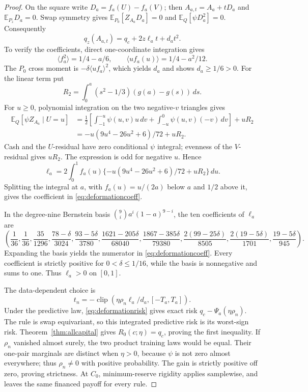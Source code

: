 \documentclass[11pt,a4paper]{amsart}
\theoremstyle{plain}
\theoremstyle{definition}
\theoremstyle{remark}
\newcommand{\EE}{\mathbb{E}}
\DeclareMathOperator{\clip}{clip}
\newcommand{\br}[1]{\langle #1\rangle}
\begin{document}
\begin{proof}
On the square write $D_a=f_a(U)-f_a(V)$; then $A_{a,t}=A_a+tD_a$ and $\EE_{P_z}D_a=0$. Swap symmetry gives $\EE_{P_0}[Z_{A_a}D_a]=0$ and $\EE_Q[\psi D_a^2]=0$. Consequently
\begin{equation}\label{eq:deformationrisk}
 q_z(A_{a,t})=q_c+2z\ell_a t+d_a t^2.
\end{equation}
To verify the coefficients, direct one-coordinate integration gives
\[
 \br{f_a^2}=1/4-a/6,\qquad
 \br{u f_a(u)}=1/4-a^2/12.
\]
The $P_0$ cross moment is $-\delta\br{uf_a}^2$, which yields $d_a$ and shows $d_a\ge1/6>0$.
For the linear term put
\[
 R_2=\int_0^a(s^2-1/3)(g(a)-g(s))\,ds.
\]
For $u\ge0$, polynomial integration on the two negative-$v$ triangles gives
\begin{align*}
 \EE_Q[\psi Z_{A_a}\mid U=u]
 &=\tfrac12\left[\int_{-1}^{-u}\psi(u,v)u\,dv
                  +\int_{-u}^{0}\psi(u,v)(-v)\,dv\right]+uR_2\\
 &=-u(9u^4-26u^2+6)/72+uR_2.
\end{align*}
Cash and the $U$-residual have zero conditional $\psi$ integral; evenness of the $V$-residual gives $uR_2$. The expression is odd for negative $u$. Hence
\begin{equation}\label{eq:ellintegral}
 \ell_a=2\int_0^1 f_a(u)
       \{-u(9u^4-26u^2+6)/72+uR_2\}\,du.
\end{equation}
Splitting the integral at $a$, with $f_a(u)=u/(2a)$ below $a$ and $1/2$ above it, gives the coefficient in \eqref{eq:deformationcoeff}.

In the degree-nine Bernstein basis $\binom9i a^i(1-a)^{9-i}$, the ten coefficients of $\ell_a$ are
\begin{equation}\label{eq:bernstein}
 \left(
 \frac1{36},\frac1{36},\frac{35}{1296},
 \frac{78-\delta}{3024},\frac{93-5\delta}{3780},
 \frac{1621-205\delta}{68040},\frac{1867-385\delta}{79380},
 \frac{2(99-25\delta)}{8505},\frac{2(19-5\delta)}{1701},
 \frac{19-5\delta}{945}\right).
\end{equation}
Expanding the basis yields the numerator in \eqref{eq:deformationcoeff}. Every coefficient is strictly positive for $0<\delta\le1/16$, while the basis is nonnegative and sums to one. Thus $\ell_a>0$ on $[0,1]$.

The data-dependent choice is
\[
 t_n=-\clip(\eta\rho_n\ell_a/d_a,[-T_a,T_a]).
\]
Under the predictive law, \eqref{eq:deformationrisk} gives exact risk $q_c-\Psi_a(\eta\rho_n)$. The rule is swap equivariant, so this integrated predictive risk is its worst-sign risk. Theorem~\ref{thm:allcapital} gives $R_0(c;\eta)=q_c$, proving the first inequality. If $\rho_n$ vanished almost surely, the two product training laws would be equal. Their one-pair marginals are distinct when $\eta>0$, because $\psi$ is not zero almost everywhere; thus $\rho_n\ne0$ with positive probability. The gain is strictly positive off zero, proving strictness. At $C_0$, minimum-reserve rigidity applies samplewise, and leaves the same financed payoff for every rule.
\end{proof}
\end{document}
